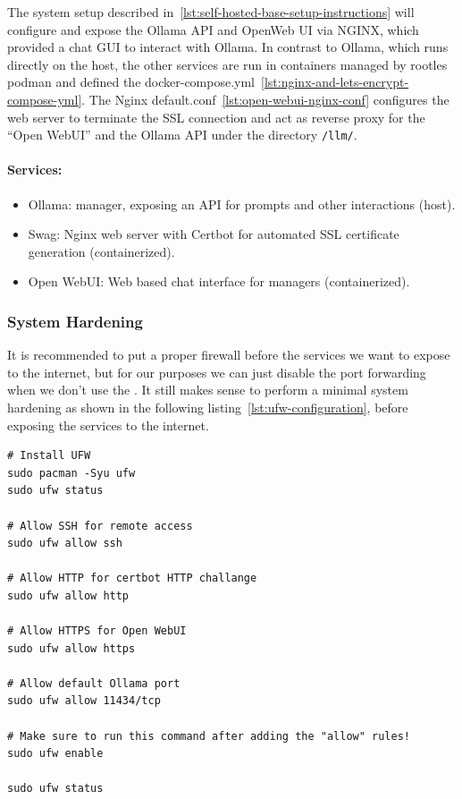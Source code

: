The system setup described in~\ref{lst:self-hosted-base-setup-instructions} will configure and expose the Ollama \gls{API} and OpenWeb UI via NGINX,
which provided a chat \gls{GUI} to interact with Ollama.
In contrast to Ollama, which runs directly on the host, the other services are run in containers managed by rootles podman and defined the docker-compose.yml~\ref{lst:nginx-and-lets-encrypt-compose-yml}.
The \gls{Nginx} default.conf~\ref{lst:open-webui-nginx-conf} configures the web server to terminate the SSL connection and
act as reverse proxy for the \enquote{Open WebUI} and the Ollama \gls{API} under the directory \texttt{/llm/}.

\paragraph{Services:}
\begin{itemize}
    \item Ollama:  manager, exposing an \gls{API} for prompts and other interactions (host).
    \item Swag: \gls{Nginx} web server with Certbot for automated SSL certificate generation (containerized).
    \item Open WebUI: Web based chat interface for  managers (containerized).
\end{itemize}

\newpage
\subsubsection{System Hardening}\label{subsubsec:system_hardening}

It is recommended to put a proper firewall before the services we want to expose to the internet,
but for our purposes we can just disable the port forwarding when we don't use the .
It still makes sense to perform a minimal system hardening as shown in the following listing~\ref{lst:ufw-configuration},
before exposing the services to the internet.

\begin{listing}[H]
\begin{verbatim}
# Install UFW
sudo pacman -Syu ufw
sudo ufw status

# Allow SSH for remote access
sudo ufw allow ssh

# Allow HTTP for certbot HTTP challange
sudo ufw allow http

# Allow HTTPS for Open WebUI
sudo ufw allow https

# Allow default Ollama port
sudo ufw allow 11434/tcp

# Make sure to run this command after adding the "allow" rules!
sudo ufw enable

sudo ufw status
\end{verbatim}
\caption{UFW configuration}
\label{lst:ufw-configuration}
\end{listing}

